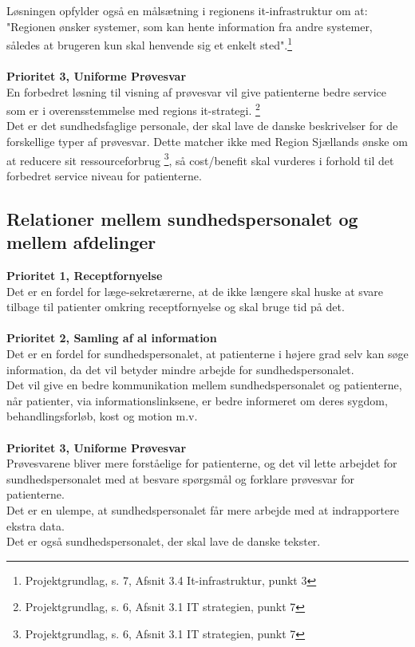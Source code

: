 Løsningen opfylder også en målsætning i regionens it-infrastruktur om at: "Regionen ønsker systemer, som kan hente information fra andre systemer, således at brugeren kun skal henvende sig et enkelt sted".\footnote{Projektgrundlag, s. 7, Afsnit 3.4 It-infrastruktur, punkt 3}
\\\\
\textbf{Prioritet 3, Uniforme Prøvesvar}\\ %
En forbedret løsning til visning af prøvesvar vil give patienterne bedre service som er i overensstemmelse med regions it-strategi. \footnote{Projektgrundlag, s. 6, Afsnit 3.1 IT strategien, punkt 7}\\
Det er det sundhedsfaglige personale, der skal lave de danske beskrivelser for de forskellige typer af prøvesvar. Dette matcher ikke med Region Sjællands ønske om at reducere sit ressourceforbrug \footnote{Projektgrundlag, s. 6, Afsnit 3.1 IT strategien, punkt 7}, så cost/benefit skal vurderes i forhold til det forbedret service niveau for patienterne. 
\subsection{Relationer mellem sundhedspersonalet og mellem afdelinger}
\textbf{Prioritet 1, Receptfornyelse}\\
Det er en fordel for læge-sekretærerne, at de ikke længere skal huske at svare tilbage til patienter omkring receptfornyelse og skal bruge tid på det.
\\\\
\textbf{Prioritet 2, Samling af al information}\\
Det er en fordel for sundhedspersonalet, at patienterne i højere grad selv kan søge information, da det vil betyder mindre arbejde for sundhedspersonalet.\\
Det vil give en bedre kommunikation mellem sundhedspersonalet og patienterne, når patienter, via informationslinksene, er bedre informeret om deres sygdom, behandlingsforløb, kost og motion m.v.
\\\\
\textbf{Prioritet 3, Uniforme Prøvesvar}\\
Prøvesvarene bliver mere forståelige for patienterne, og det vil lette arbejdet for sundhedspersonalet med at besvare spørgsmål og forklare prøvesvar for patienterne.\\
Det er en ulempe, at sundhedspersonalet får mere arbejde med at indrapportere ekstra data. \\ Det er også sundhedspersonalet, der skal lave de danske tekster.
